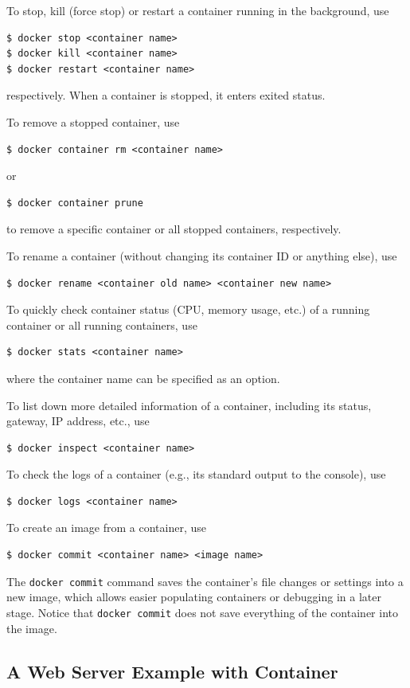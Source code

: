 To stop, kill (force stop) or restart a container running in the background, use
\begin{lstlisting}
$ docker stop <container name>
$ docker kill <container name>
$ docker restart <container name>
\end{lstlisting}
respectively. When a container is stopped, it enters exited status.

To remove a stopped container, use
\begin{lstlisting}
$ docker container rm <container name>
\end{lstlisting}
or
\begin{lstlisting}
$ docker container prune
\end{lstlisting}
to remove a specific container or all stopped containers, respectively.

To rename a container (without changing its container ID or anything else), use
\begin{lstlisting}
$ docker rename <container old name> <container new name>
\end{lstlisting}

To quickly check container status (CPU, memory usage, etc.) of a running container or all running containers, use
\begin{lstlisting}
$ docker stats <container name>
\end{lstlisting}
where the container name can be specified as an option.

To list down more detailed information of a container, including its status, gateway, IP address, etc., use
\begin{lstlisting}
$ docker inspect <container name>
\end{lstlisting}

To check the logs of a container (e.g., its standard output to the console), use
\begin{lstlisting}
$ docker logs <container name>
\end{lstlisting}

To create an image from a container, use
\begin{lstlisting}
$ docker commit <container name> <image name>
\end{lstlisting}
The \verb|docker commit| command saves the container's file changes or settings into a new image, which allows easier populating containers or debugging in a later stage. Notice that \verb|docker commit| does not save everything of the container into the image.

\subsection{A Web Server Example with Container}

